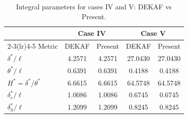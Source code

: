 
\begin{table}[ht]
  \centering
  \caption{Integral parameters for cases IV and V: DEKAF vs Present.}
  \label{tab:integral_params_compare_iv_v}
  \setlength{\tabcolsep}{6pt}
  \small
  \begin{tabular}{@{}lcccc@{}}
    \toprule
    & \multicolumn{2}{c}{Case IV} & \multicolumn{2}{c}{Case V} \\
    \cmidrule(lr){2-3}\cmidrule(lr){4-5}
    Metric & DEKAF & Present & DEKAF & Present \\
    \midrule
    $\delta^*/\ell$        & 4.2571  & 4.2571  & 27.0430 & 27.0430 \\
    $\theta^*/\ell$        & 0.6391  & 0.6391  & 0.4188  & 0.4188  \\
    $H^*=\delta^*/\theta^*$& 6.6615  & 6.6615  & 64.5748 & 64.5748 \\
    $\delta_e^*/\ell$      & 1.0086  & 1.0086  & 0.6745  & 0.6745  \\
    $\delta_h^*/\ell$      & 1.2099  & 1.2099  & 0.8245  & 0.8245  \\
    \bottomrule
  \end{tabular}
\end{table}




